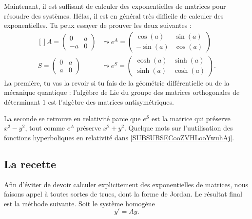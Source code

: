 Maintenant, il est suffisant de calculer des exponentielles de matrices pour résoudre des systèmes. Hélas, il est en général très difficile de calculer des exponentielles. Tu peux essayer de prouver les deux suivantes :
\begin{equation}
	\begin{aligned}[]
		A=\begin{pmatrix}
	0	&	a	\\ 
	-a	&	0	
\end{pmatrix}	&\leadsto  e^{A}=\begin{pmatrix}
	\cos(a)	&	\sin(a)	\\ 
	-\sin(a)	&	\cos(a)	
\end{pmatrix}\\
		S=\begin{pmatrix}
	0	&	a	\\ 
	a	&	0	
\end{pmatrix}	&\leadsto  e^{S}=\begin{pmatrix}
	\cosh(a)	&	\sinh(a)	\\ 
	\sinh(a)	&	\cosh(a)	
\end{pmatrix}.
	\end{aligned}
\end{equation}
La première, tu vas la revoir si tu fais de la géométrie différentielle ou de la mécanique quantique : l'algèbre de Lie du groupe des matrices orthogonales de déterminant $1$ est l'algèbre des matrices antisymétriques.

La seconde se retrouve en relativité parce que $e^S$ est la matrice qui préserve $x^2-y^2$, tout comme $e^A$ préserve $x^2+y^2$. Quelque mots sur l'uutilisation des fonctions hyperboliques en relativité dans \ref{SUBSUBSECooZVHLooYwuhAj}.

					\subsection{La recette}

Afin d'éviter de devoir calculer explicitement des exponentielles de matrices, nous faisons appel à toutes sortes de trucs, dont la forme de Jordan. Le résultat final est la méthode suivante. Soit le système homogène
\begin{equation}
	\bar y'=A\bar y.
\end{equation}

